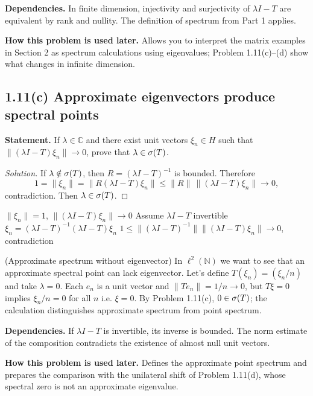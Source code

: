 \noindent\textbf{Dependencies.} In finite dimension, injectivity and surjectivity of $\lambda I-T$ are equivalent by rank and nullity. The definition of spectrum from Part 1 applies.

\noindent\textbf{How this problem is used later.} Allows you to interpret the matrix examples in Section 2 as spectrum calculations using eigenvalues; Problem 1.11(c)--(d) show what changes in infinite dimension.

\subsection*{1.11(c) Approximate eigenvectors produce spectral points}

\noindent\textbf{Statement.} If $\lambda\in\mathbb C$ and there exist unit vectors $\xi_n\in H$ such that $\|(\lambda I-T)\xi_n\|\to0$, prove that $\lambda\in\sigma(T)$.

\begin{proof}[Solution]
If $\lambda\notin\sigma(T)$, then $R=(\lambda I-T)^{-1}$ is bounded. Therefore
\[
1=\|\xi_n\|=\|R(\lambda I-T)\xi_n\|
\le\|R\|\,\|(\lambda I-T)\xi_n\|\to0,
\]
contradiction. Then $\lambda\in\sigma(T)$.
\end{proof}

\proofdiagram
{$\|\xi_n\|=1$, $\|(\lambda I-T)\xi_n\|\to0$}
{Assume $\lambda I-T$ invertible}
{$\xi_n=(\lambda I-T)^{-1}(\lambda I-T)\xi_n$}
{$1\le\|(\lambda I-T)^{-1}\|\|(\lambda I-T)\xi_n\|\to0$, contradiction}

\begin{cthejemplo}{(Approximate spectrum without eigenvector)}
In $\ell^2(\mathbb N)$ we want to see that an approximate spectral point can lack
eigenvector. Let's define $T(\xi_n)=(\xi_n/n)$ and take $\lambda=0$.
Each $e_n$ is a unit vector and $\|Te_n\|=1/n\to0$, but $T\xi=0$ implies
$\xi_n/n=0$ for all $n$ i.e. $\xi=0$.
By Problem 1.11(c), $0\in\sigma(T)$; the calculation distinguishes approximate spectrum from point spectrum.
\end{cthejemplo}

\noindent\textbf{Dependencies.} If $\lambda I-T$ is invertible, its inverse is bounded. The norm estimate of the composition contradicts the existence of almost null unit vectors.

\noindent\textbf{How this problem is used later.} Defines the approximate point spectrum and prepares the comparison with the unilateral shift of Problem 1.11(d), whose spectral zero is not an approximate eigenvalue.

